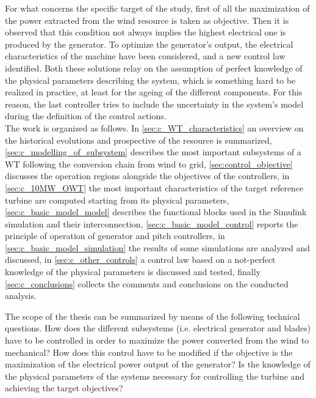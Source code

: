 For what concerns the specific target of the study, first of all the maximization of the power extracted from the wind resource is taken as objective. Then it is observed that this condition not always implies the highest electrical one is produced by the generator. To optimize the generator's output, the electrical characteristics of the machine have been considered, and a new control law identified. Both these solutions relay on the assumption of perfect knowledge of the physical parameters describing the system, which is something hard to be realized in practice, at least for the ageing of the different components. For this reason, the last controller tries to include the uncertainty in the system's model during the definition of the control actions.  \\
The work is organized as follows. In \autoref{sec:c_WT_characteristics} an overview on the historical evolutions and prospective of the resource is summarized, \autoref{sec:c_modelling_of_subsystem} describes the most important subsystems of a WT following the conversion chain from wind to grid, \autoref{sec:control_objective} discusses the operation regions alongside the objectives of the controllers, in \autoref{sec:c_10MW_OWT} the most important characteristics of the target reference turbine are computed starting from its physical parameters, \autoref{sec:c_basic_model_model} describes the functional blocks used in the Simulink simulation and their interconnection, \autoref{sec:c_basic_model_control} reports the principle of operation of generator and pitch controllers, in \autoref{sec:c_basic_model_simulation} the results of some simulations are analyzed and discussed, in \autoref{sec:c_other_controls} a control law based on a not-perfect knowledge of the physical parameters is discussed and tested, finally \autoref{sec:c_conclusions} collects the comments and conclusions on the conducted analysis.

The scope of the thesis can be summarized by means of the following technical questions. How does the different subsystems (i.e. electrical generator and blades) have to be controlled in order to maximize the power converted from the wind to mechanical? How does this control have to be modified if the objective is the maximization of the electrical power output of the generator? Is the knowledge of the physical parameters of the systems necessary for controlling the turbine and achieving the target objectives? 

